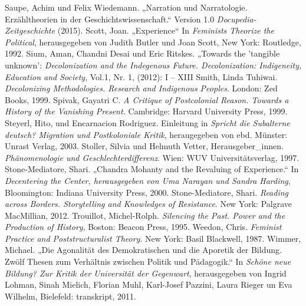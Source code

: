 \begin{thebibliography}{100}
 Saupe, Achim und Felix Wiedemann. „Narration und Narratologie. Erzähltheorien in der
Geschichtswissenschaft.“ Version 1.0 \emph{Docupedia-Zeitgeschichte} (2015). 
 Scott, Joan. „Experience“ In \emph{Feminists Theorize the Political}, herausgegeben von Judith Butler und Joan Scott, New York: Routledge, 1992.
 Sium, Aman, Chandni Desai und Eric Ritskes. „Towards the
'tangible unknown': \emph{Decolonization  and the Indegenous Future.
Decolonization: Indigeneity, Education and Society}, Vol.1, Nr. 1, (2012): I – XIII
 Smith, Linda Tuhiwai. \emph{Decolonizing Methodologies.
Research and Indigenous Peoples}. London: Zed Books, 1999.
 Spivak, Gayatri C. \emph{A Critique of Postcolonial Reason. Towards a History of the Vanishing Present.} Cambridge: Harvard University Press, 1999.
 Steyerl, Hito, und Encarnacion Rodriguez. Einleitung in \emph{Spricht die Subalterne deutsch? Migration und Postkoloniale Kritik}, heraugegeben von ebd. Münster: Unrast Verlag, 2003.
 Stoller, Silvia und Helmuth Vetter, Herausgeber\_innen. \emph{Phänomenologie und Geschlechterdifferenz}. Wien: WUV Universitätsverlag, 1997.
 Stone-Mediatore, Shari. „Chandra Mohanty and the Revaluing of
Experience.“ In \emph{Decentering the Center, herausgegeben von Uma Narayan und Sandra Harding}, Bloomington: Indiana University Press, 2000. 
 Stone-Mediatore, Shari. \emph{Reading across Borders. Storytelling and Knowledges of Resistance}. New York: Palgrave MacMillian, 2012.
 Trouillot, Michel-Rolph. \emph{Silencing the Past. Power and the Production of History}, Boston: Beacon Press, 1995.
 Weedon, Chris. \emph{Feminist Practice and Poststructuralist Theory}. New York: Basil Blackwell, 1987.
 Wimmer, Michael. „Die Agonalität des Demokratischen und die Aporetik der Bildung. Zwölf
Thesen zum Verhältnis zwischen Politik und Pädagogik.“ In \emph{Schöne neue
Bildung? Zur Kritik der Universität der Gegenwart}, herausgegeben von Ingrid Lohman, Sinah Mielich, Florian Muhl, Karl-Josef Pazzini, Laura Rieger un Eva Wilhelm, Bielefeld: transkript, 2011.
\end{thebibliography}
